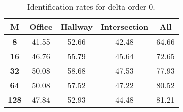 \begin{table}[h]
    \small
    \centering
    \begin{tabular}{|c|c|c|c|l|}    
    \hline
    {\bf M} & {\bf Office} & {\bf Hallway} & {\bf Intersection} &     \multicolumn{1}{c|}{{\bf All}} \\ \hline
    {\bf 8} & 41.55 & 52.66 & 42.48 & 64.66 \\ \hline
    {\bf 16} & 46.76 & 55.79 & 45.64 & 72.65 \\ \hline
    {\bf 32} & 50.08 & 58.68 & 47.53 & 77.93 \\ \hline
    {\bf 64} & 50.08 & 57.52 & 47.22 & 80.52 \\ \hline
    {\bf 128} & 47.84 & 52.93 & 44.48 & 81.21 \\ \hline
    \end{tabular}
    \caption{Identification rates for delta order 0.}    
    \label{tab:identify_speakers_mit_19_0}
\end{table}
